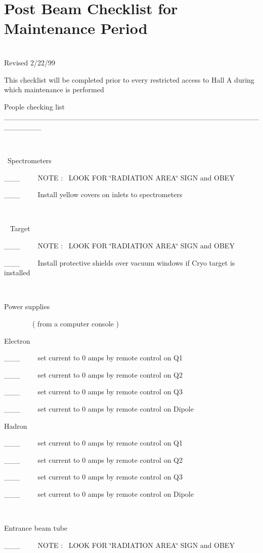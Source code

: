 \section{Post Beam Checklist for Maintenance Period}

~~~~~~~~~~~~~~~~~~~~~~~~~~~~~~~~~~~~~~~~~~~~~~~~~~~~~~~~~~~~~~~~~~~~~~~~Revised
2/22/99

This checklist will be completed prior to every restricted access
to Hall A during which maintenance is performed

People checking list \_\_\_\_\_\_\_\_\_\_\_\_\_\_\_\_\_\_\_\_\_\_\_\_\_\_\_\_\_\_\_\_\_\_\_\_\_\_\_\_\_\_\_\_\_\_\_\_\_\_\_\_\_\_\_

~
~

~Spectrometers

\_\_\_~~~~~NOTE :~ LOOK FOR \char`\"{}RADIATION AREA\char`\"{} SIGN and OBEY

\_\_\_~~~~~Install yellow covers on inlets to spectrometers

~

~ Target

\_\_\_~~~~~NOTE :~ LOOK FOR \char`\"{}RADIATION AREA\char`\"{} SIGN and OBEY

\_\_\_~~~~~Install protective shields over vacuum windows if Cryo target is
installed

~

Power supplies

~~~~~~~~( from a computer console )

Electron

\_\_\_~~~~~set current to 0 amps by remote control on Q1

\_\_\_~~~~~set current to 0 amps by remote control on Q2

\_\_\_~~~~~set current to 0 amps by remote control on Q3

\_\_\_~~~~~set current to 0 amps by remote control on Dipole

Hadron

\_\_\_~~~~~set current to 0 amps by remote control on Q1

\_\_\_~~~~~set current to 0 amps by remote control on Q2

\_\_\_~~~~~set current to 0 amps by remote control on Q3

\_\_\_~~~~~set current to 0 amps by remote control on Dipole

~

Entrance beam tube

\_\_\_~~~~~NOTE :~ LOOK FOR \char`\"{}RADIATION AREA\char`\"{} SIGN and OBEY

